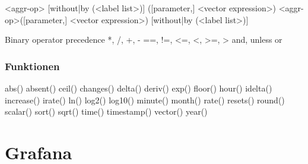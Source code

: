 <aggr-op> [without|by (<label list>)] ([parameter,] <vector expression>)
<aggr-op>([parameter,] <vector expression>) [without|by (<label list>)]

Binary operator precedence 
*, /, %
+, -
==, !=, <=, <, >=, >
and, unless
or

\subsubsection{Funktionen}

abs()
absent()
ceil()
changes()
delta()
deriv()
exp()
floor()
hour()
idelta()
increase()
irate()
ln()
log2()
log10()
minute()
month()
rate()
resets()
round()
scalar()
sort()
sqrt()
time()
timestamp()
vector()
year()

\section{Grafana}
